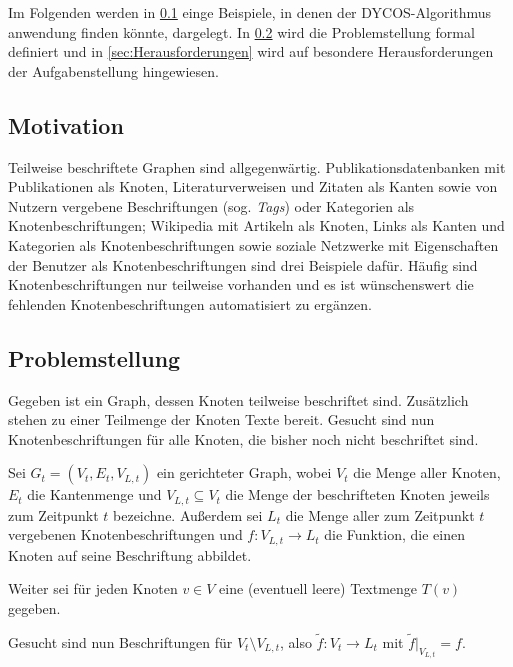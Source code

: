 Im Folgenden werden in \cref{sec:Motivation} einge Beispiele, in denen
der DYCOS-Algorithmus anwendung finden könnte, dargelegt. In
\cref{sec:Problemstellung} wird die Problemstellung formal definiert
und in \cref{sec:Herausforderungen} wird auf besondere Herausforderungen
der Aufgabenstellung hingewiesen.

\subsection{Motivation}\label{sec:Motivation}
Teilweise beschriftete Graphen sind allgegenwärtig. Publikationsdatenbanken
mit Publikationen als Knoten, Literaturverweisen und Zitaten als Kanten
sowie von Nutzern vergebene Beschriftungen (sog. {\it Tags}) oder Kategorien als Knotenbeschriftungen;
Wikipedia mit Artikeln als Knoten, Links als Kanten und Kategorien
als Knotenbeschriftungen sowie soziale Netzwerke mit Eigenschaften der Benutzer
als Knotenbeschriftungen sind drei Beispiele dafür.
Häufig sind Knotenbeschriftungen nur teilweise vorhanden und es ist wünschenswert die 
fehlenden Knotenbeschriftungen automatisiert zu ergänzen. 

\subsection{Problemstellung}\label{sec:Problemstellung}
Gegeben ist ein Graph, dessen Knoten teilweise beschriftet sind. Zusätzlich stehen
zu einer Teilmenge der Knoten Texte bereit. Gesucht sind nun Knotenbeschriftungen
für alle Knoten, die bisher noch nicht beschriftet sind.\\

\begin{definition}[Knotenklassifierungsproblem]\label{def:Knotenklassifizierungsproblem}
    Sei $G_t = (V_t, E_t, V_{L,t})$ ein gerichteter Graph,
    wobei $V_t$ die Menge aller Knoten,
    $E_t$ die Kantenmenge und $V_{L,t} \subseteq V_t$ die Menge der 
    beschrifteten Knoten jeweils zum Zeitpunkt $t$ bezeichne.
    Außerdem sei $L_t$ die Menge aller zum Zeitpunkt $t$ vergebenen
    Knotenbeschriftungen und $f:V_{L,t} \rightarrow L_t$ die Funktion, die einen
    Knoten auf seine Beschriftung abbildet.

    Weiter sei für jeden Knoten $v \in V$ eine (eventuell leere)
    Textmenge $T(v)$ gegeben.

    Gesucht sind nun Beschriftungen für $V_t \setminus V_{L,t}$, also
    $\tilde{f}: V_t \rightarrow L_t$ mit 
    $\tilde{f}|_{V_{L,t}} = f$.
\end{definition}

